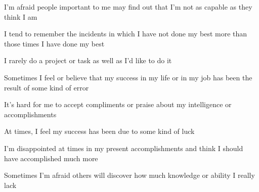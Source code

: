 \documentclass[aspectratio=169]{beamer}
\begin{document}
\begin{frame}
  \begin{center}
    \Huge  I’m  afraid  people  important  to  me  may  find  out  that  I’m  not  as  capable  as  they  think  I  am
  \end{center}
\end{frame}

\begin{frame}
  \begin{center}
    \Huge I tend to remember the incidents in which I have not done my best more than those times I have done my best
  \end{center}
\end{frame}

\begin{frame}
  \begin{center}
    \Huge  I rarely do a project or task as well as I’d like to do it
  \end{center}
\end{frame}

\begin{frame}
  \begin{center}
    \Huge  Sometimes I feel or believe that my success in my life or in my job has been the result of some kind of error
  \end{center}
\end{frame}

\begin{frame}
  \begin{center}
    \Huge    It’s  hard  for  me  to  accept  compliments  or  praise  about  my  intelligence  or  accomplishments
  \end{center}
\end{frame}

\begin{frame}
  \begin{center}
    \Huge At times, I feel my success has been due to some kind of luck
  \end{center}
\end{frame}

\begin{frame}
  \begin{center}
    \Huge   I’m  disappointed  at  times  in  my  present  accomplishments  and  think  I should have accomplished much more
\end{center}
\end{frame}

\begin{frame}
  \begin{center}
    \Huge   Sometimes I’m afraid others will discover how much knowledge or ability I really lack
  \end{center}
\end{frame}
\end{document}
